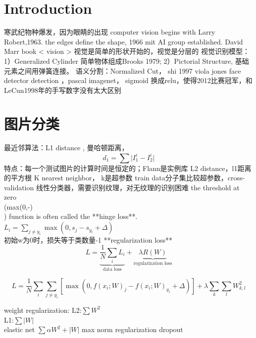 \documentclass[UTF8]{article}
\begin{document}
\section{Introduction}
    寒武纪物种爆发，因为眼睛的出现
    computer vision begins with Larry Robert,1963. the edges define the shape, 1966 mit AI group established. 
    David Marr book < vision >
    视觉是简单的形状开始的，视觉是分层的
    视觉识别模型：1）Generalized Cylinder 简单物体组成Brooks 1979; 2）Pictorial Structure, 基础元素之间用弹簧连接。
    语义分割：Normalized Cut， shi 1997
    viola jones face detector
    detection ，pascal imagenet，
    sigmoid 换成relu，使得2012比赛冠军，和LeCun1998年的手写数字没有太大区别
%


\section{图片分类}
    最近邻算法：L1 distance , 曼哈顿距离，
    \begin{equation}
        d_1=\sum \lvert I_1^i -I_2^i \lvert
    \end{equation}
    特点：每一个测试图片的计算时间是恒定的；Flann是实例库
    L2 distance，l1距离的平方根
    K nearest neighbor， k是超参数
    train data分子集比较超参数，cross-validation 
    线性分类器，需要识别纹理，对无纹理的识别困难
    the threshold at zero \\(max(0,-)\\) function is often called the **hinge loss**. \\
    $
    L_i = \sum_{j\neq y_i} \max(0, s_j - s_{y_i} + \Delta)
    $\\
    初始w为0时，损失等于类数量-1
    **regularization loss**\\
    \begin{equation}
        \label{}
        L =  \underbrace{ \frac{1}{N} \sum_i L_i }_\text{data loss} + \underbrace{ \lambda R(W) }_\text{regularization loss}
    \end{equation}

    \begin{equation}
        \label{}
        L = \frac{1}{N} \sum_i \sum_{j\neq y_i} \left[ \max(0, f(x_i; W)_j - f(x_i; W)_{y_i} + \Delta) \right] + \lambda \sum_k\sum_l W_{k,l}^2
    \end{equation}
     
%

    weight regularization:
    L2:$\sum W^2$\\
    L1:$\sum |W|$\\
    elastic net $\sum \alpha W^2+|W|$
    max norm regularization
    dropout 
\end{document}
